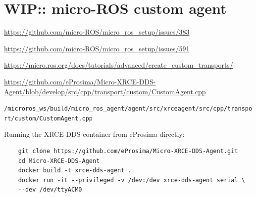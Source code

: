 \documentclass[10pt]{article}
\begin{document}


  

\section{WIP:: micro-ROS custom agent}

\url{https://github.com/micro-ROS/micro_ros_setup/issues/383}

\url{https://github.com/micro-ROS/micro_ros_setup/issues/591}

\url{https://micro.ros.org/docs/tutorials/advanced/create_custom_transports/}

\url{https://github.com/eProsima/Micro-XRCE-DDS-Agent/blob/develop/src/cpp/transport/custom/CustomAgent.cpp}

\verb|/microros_ws/build/micro_ros_agent/agent/src/xrceagent/src/cpp/transport/custom/CustomAgent.cpp|


Running the XRCE-DDS container from eProsima directly:
\begin{tcolorbox}
  \begin{verbatim}
    git clone https://github.com/eProsima/Micro-XRCE-DDS-Agent.git
    cd Micro-XRCE-DDS-Agent
    docker build -t xrce-dds-agent .
    docker run -it --privileged -v /dev:/dev xrce-dds-agent serial \
    --dev /dev/ttyACM0
  \end{verbatim}
\end{tcolorbox}
\end{document}
